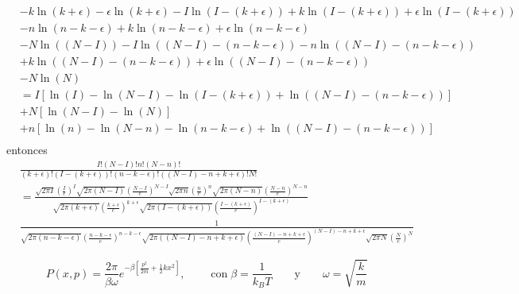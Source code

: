 \documentclass[a4paper]{article}
\begin{document}
\begin{answer}[punto ]
\begin{align*}
            &- k \ln \left(k + \epsilon\right) - \epsilon \ln \left(k + \epsilon\right)  - I \ln \left(I - (k+\epsilon)\right) + k\ln \left(I - (k+\epsilon)\right)  + \epsilon \ln \left(I - (k+\epsilon)\right)  \\
            &- n \ln \left(n - k-\epsilon\right) + k \ln \left(n - k-\epsilon\right) + \epsilon \ln \left(n - k-\epsilon\right) \\
            &- N \ln \left((N-I)\right) -I \ln \left((N-I) - (n - k-\epsilon)\right) - n \ln \left((N-I) - (n - k-\epsilon)\right) \\
            &+ k \ln \left((N-I) - (n - k-\epsilon)\right) + \epsilon \ln \left((N-I) - (n - k-\epsilon)\right) \\
            & - N \ln \left(N\right) \\
            &= I\left[
                \ln \left(I\right)  - \ln \left(N-I\right) - \ln \left(I - (k+\epsilon)\right) + \ln \left((N-I) - (n - k-\epsilon)\right)
            \right]\\
            &+ N\left[
                \ln \left(N-I\right) - \ln \left(N\right)
            \right]\\
            &+ n\left[
                \ln \left(n\right)  - \ln \left(N-n\right) - \ln \left(n - k-\epsilon\right) + \ln \left((N-I) - (n - k-\epsilon)\right)
            \right]\\
        \end{align*}
        entonces
        \begin{align*}
            &\frac{I!(N-I)!n!(N-n)!}{(k + \epsilon)!(I - (k+\epsilon))!(n - k-\epsilon)!((N-I) - n + k+\epsilon)!N!}\\ 
            &=\frac{\sqrt{2\pi I}(\frac{I}{e})^I\sqrt{2\pi (N-I)}(\frac{N-I}{e})^{N-I}\sqrt{2\pi n}(\frac{n}{e})^n\sqrt{2\pi (N-n)}(\frac{N-n}{e})^{N-n}}{\sqrt{2\pi (k + \epsilon)}(\frac{k + \epsilon}{e})^{k + \epsilon}\sqrt{2\pi (I - (k+\epsilon))}(\frac{I - (k+\epsilon)}{e})^{I - (k+\epsilon)}} \\
            &\frac{1}{\sqrt{2\pi (n - k-\epsilon)}(\frac{n - k-\epsilon}{e})^{n - k-\epsilon}\sqrt{2\pi ((N-I) - n + k+\epsilon)}(\frac{(N-I) - n + k+\epsilon}{e})^{(N-I) - n + k+\epsilon}\sqrt{2\pi N}(\frac{N}{e})^N}
        \end{align*}     
    \end{answer}
    $$
    P(x, p)=\frac{2 \pi}{\beta \omega} e^{-\beta\left[\frac{p^2}{2 m}+\frac{1}{2} k x^2\right]},\qquad  \operatorname{con} \beta=\frac{1}{k_B T} \qquad \mathrm{y} \qquad \omega=\sqrt{\frac{k}{m}}
    $$
\end{document}
